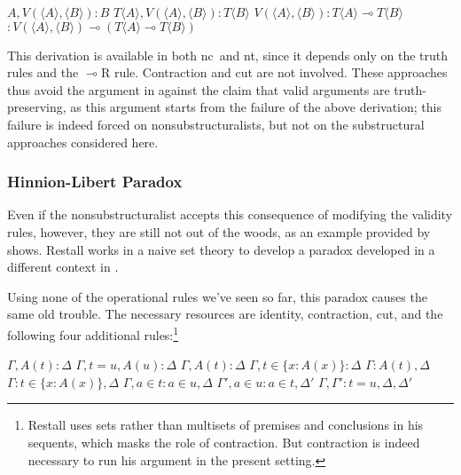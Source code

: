 \documentclass{ergoclass}
\def\fCenter{:}
\newcommand{\set}[2]{\ensuremath{\{#1 : #2\}}}
\newcommand{\Tname}[1]{\T\name{#1}}
\newcommand{\name}[1]{\ensuremath{\langle #1 \rangle}}
\newcommand{\mcond}{\ensuremath{\multimap}}
\newcommand{\T}{\ensuremath{T}}
\newcommand{\D}{\Delta}
\newcommand{\G}{\Gamma}
\newcommand{\hs}{\hskip 5mm}
\newcommand{\vs}{\vskip 5mm}
\newcommand{\BIx}[2]{\BinaryInf$ #1 \fCenter #2$}
\newcommand{\UIx}[2]{\UnaryInf$ #1 \fCenter #2$}
\newcommand{\AXx}[2]{\Axiom$ #1 \fCenter #2$}
\newcommand{\LLl}[1]{\LeftLabel{\scriptsize #1:\quad}}
\newcommand{\nclog}{{\sc nc}}
\newcommand{\ntlog}{{\sc nt}}
\renewcommand{\cite}{\citet}						%
\begin{document}
\vs

{\centering
\AXx{A, V(\name{A}, \name{B})}{B}
\LLl{$\T$L, $\T$R}
\UIx{\Tname{A}, V(\name{A}, \name{B})}{\Tname{B}}
\LLl{$\mcond$R}
\UIx{V(\name{A}, \name{B})}{\Tname{A} \mcond \Tname{B}}
\LLl{$\mcond$R}
\UIx{}{V(\name{A}, \name{B}) \mcond (\Tname{A} \mcond \Tname{B})}
\DP

}
\vs
This derivation is available in both \nclog\ and \ntlog, since it depends only on the truth rules and the $\mcond$R rule. Contraction and cut are not involved. These approaches thus avoid the argument in \cite[p.\ 284--286]{field:stp} against the claim that valid arguments are truth-preserving, as this argument starts from the failure of the above derivation; this failure is indeed forced on nonsubstructuralists, but not on the substructural approaches considered here.


\subsubsection{Hinnion-Libert Paradox}

Even if the nonsubstructuralist accepts this consequence of modifying the validity rules, however, they are still not out of the woods, as an example provided by \cite{restall:adnct} shows. Restall works in a naive set theory to develop a paradox developed in a different context in \cite{hl:pae}.

Using none of the operational rules we've seen so far, this paradox causes the same old trouble. The necessary resources are identity, contraction, cut, and the following four additional rules:\footnote{Restall uses sets rather than multisets of premises and conclusions in his sequents, which masks the role of contraction. But contraction is indeed necessary to run his argument in the present setting.}



\begin{center}
\AXx{\G, A(t)}{\D}
\LLl{=L}
\UIx{\G, t = u, A(u)}{\D}
\DP
\vs
\AXx{\G, A(t)}{\D}
\LLl{$\in$L}
\UIx{\G, t \in \set{x}{A(x)}}{\D}
\DP
\hs
\AXx{\G}{A(t), \D}
\LLl{$\in$R}
\UIx{\G}{t \in \set{x}{A(x)}, \D}
\DP
\vs
\AXx{\G, a \in t}{a \in u, \D}
\AXx{\G', a \in u}{a \in t, \D'}
\LLl{Ext}
\BIx{\G, \G'}{t = u, \D, \D'}
\DP
\end{center}
\end{document}
